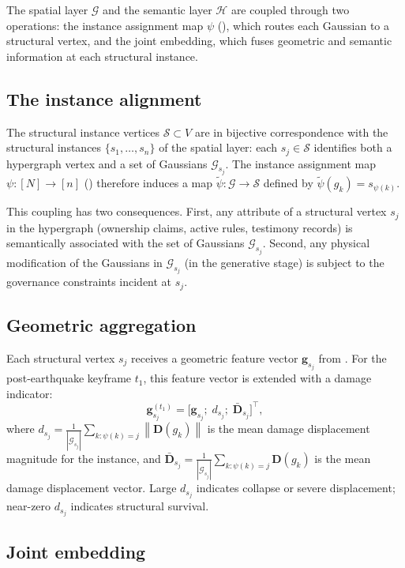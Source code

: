 \documentclass[11pt,a4paper]{article}
\theoremstyle{plain}
\theoremstyle{definition}
\theoremstyle{remark}
\newcommand{\norm}[1]{\left\lVert #1 \right\rVert}
\newcommand{\GS}{\mathcal{G}}
\newcommand{\HG}{\mathcal{H}}
\newcommand{\Struc}{\mathcal{S}}
\newcommand{\inst}{\psi}
\newcommand{\gvec}{\mathbf{g}}
\begin{document}
The spatial layer $\GS$ and the semantic layer $\HG$ are coupled through
two operations: the instance assignment map $\inst$ (),
which routes each Gaussian to a structural vertex, and the joint
embedding, which fuses geometric and semantic information at each
structural instance.

\subsection{The instance alignment}
\label{sec:layer3_alignment}

The structural instance vertices $\Struc \subset V$ are in bijective
correspondence with the structural instances $\{s_1, \ldots, s_n\}$
of the spatial layer: each $s_j \in \Struc$ identifies both a
hypergraph vertex and a set of Gaussians $\GS_{s_j}$.
The instance assignment map $\inst : [N] \to [n]$
() therefore induces a map
$\tilde{\inst} : \GS \to \Struc$ defined by
$\tilde{\inst}(g_k) = s_{\inst(k)}$.

This coupling has two consequences. First, any attribute of a
structural vertex $s_j$ in the hypergraph (ownership claims, active
rules, testimony records) is semantically associated with the set of
Gaussians $\GS_{s_j}$. Second, any physical modification of the
Gaussians in $\GS_{s_j}$ (in the generative stage) is subject to the
governance constraints incident at $s_j$.

\subsection{Geometric aggregation}
\label{sec:layer3_geom_agg}

Each structural vertex $s_j$ receives a geometric feature vector
$\gvec_{s_j}$ from . For the post-earthquake
keyframe $t_1$, this feature vector is extended with a damage indicator:
\[
  \gvec_{s_j}^{(t_1)}
  = \bigl[\gvec_{s_j};\;
    d_{s_j};\;
    \bar{\mathbf{D}}_{s_j}\bigr]^\top,
\]
where $d_{s_j} = \frac{1}{|\GS_{s_j}|}
\sum_{k:\inst(k)=j}\norm{\mathbf{D}(g_k)}$ is the mean damage
displacement magnitude for the instance, and
$\bar{\mathbf{D}}_{s_j} = \frac{1}{|\GS_{s_j}|}
\sum_{k:\inst(k)=j}\mathbf{D}(g_k)$
is the mean damage displacement vector. Large $d_{s_j}$ indicates
collapse or severe displacement; near-zero $d_{s_j}$ indicates
structural survival.

\subsection{Joint embedding}
\label{sec:layer3_joint}
\end{document}
